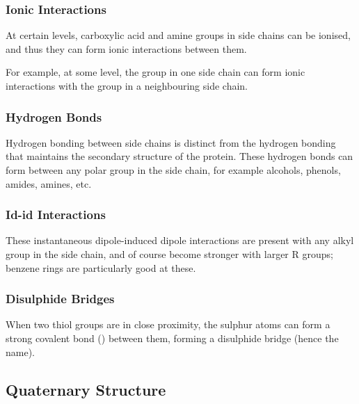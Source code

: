 			\subsubsection{Ionic Interactions}

				At certain \pH{} levels, carboxylic acid and amine groups in side chains can be ionised, and thus they can form ionic
				interactions between them.

				For example, at some \pH{} level, the  group in one side chain can form ionic interactions with the  group
				in a neighbouring side chain.



			\subsubsection{Hydrogen Bonds}

				Hydrogen bonding between side chains is distinct from the hydrogen bonding that maintains the secondary structure of the protein.
				These hydrogen bonds can form between any polar group in the side chain, for example alcohols, phenols, amides, amines, etc.



			\subsubsection{Id-id Interactions}

				These instantaneous dipole-induced dipole interactions are present with any alkyl group in the side chain, and of course become
				stronger with larger R groups; benzene rings are particularly good at these.



			\subsubsection{Disulphide Bridges}

				When two thiol  groups are in close proximity, the sulphur atoms can form a strong covalent bond () between them,
				forming a disulphide bridge (hence the name).




		\subsection{Quaternary Structure}

